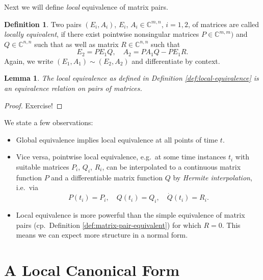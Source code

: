 \documentclass[]{book}
\providecommand{\tightlist}{%
  \setlength{\itemsep}{0pt}\setlength{\parskip}{0pt}}
\newtheorem{lemma}{Lemma}[chapter]
\theoremstyle{definition}
\newtheorem{definition}{Definition}[chapter]
\theoremstyle{definition}
\theoremstyle{definition}
\theoremstyle{definition}
\theoremstyle{remark}
\begin{document}
Next we will define \emph{local} equivalence of matrix pairs.

\begin{definition}
\protect\hypertarget{def:local-equivalence}{}{\label{def:local-equivalence} }Two pairs \((E_i,A_i)\), \(E_i\), \(A_i \in \mathbb C^{m,n}\),
\(i=1,2\), of matrices are called \emph{locally equivalent}, if there exist
pointwise nonsingular matrices \(P \in \mathbb C^{m,m})\) and \(Q\in \mathbb C^{n,n}\) such that as well as matrix \(R\in \mathbb C^{n,n}\) such that
\begin{equation}
E_2=PE_1Q, \quad A_2 = PA_1Q-PE_1R \label{eq:iv-loc-equiv-mpairs}.
\end{equation}
Again, we write \((E_1,A_1) \sim (E_2, A_2)\) and differentiate by context.
\end{definition}

\begin{lemma}
\protect\hypertarget{lem:iv-loc-equiv-rst}{}{\label{lem:iv-loc-equiv-rst} }The local equivalence as defined in Definition \ref{def:local-equivalence} is an equivalence relation on pairs of matrices.
\end{lemma}

\begin{proof}
{}Exercise!
\end{proof}

We state a few observations:

\begin{itemize}
\tightlist
\item
  Global equivalence implies local equivalence at all points of time \(t\).
\item
  Vice versa, pointwise local equivalence, e.g.~at some time instances \(t_i\) with suitable matrices \(P_i\), \(Q_i\), \(R_i\), can be interpolated to a continuous matrix function \(P\) and a differentiable matrix function \(Q\) by \emph{Hermite interpolation}, i.e.~via
  \[
  P(t_i) = P_i, \quad Q(t_i) = Q_i, \quad \dot Q(t_i) = R_i.
  \]
\item
  Local equivalence is more powerful than the simple equivalence of matrix pairs (cp.~Definition \ref{def:matrix-pair-equivalent}) for which \(R=0\). This means we can expect more structure in a normal form.
\end{itemize}

\hypertarget{a-local-canonical-form}{%
\section{A Local Canonical Form}\label{a-local-canonical-form}}
\end{document}
